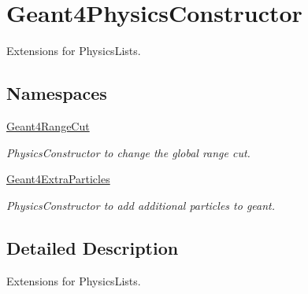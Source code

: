 \hypertarget{group___geant4_physics_constructor}{}\section{Geant4\+Physics\+Constructor}
\label{group___geant4_physics_constructor}


Extensions for Physics\+Lists.  


\subsection*{Namespaces}
\begin{DoxyCompactItemize}
\item 
 \hyperlink{namespace_geant4_range_cut}{Geant4\+Range\+Cut}
\begin{DoxyCompactList}\small\item\em Physics\+Constructor to change the global range cut. \end{DoxyCompactList}\item 
 \hyperlink{namespace_geant4_extra_particles}{Geant4\+Extra\+Particles}
\begin{DoxyCompactList}\small\item\em Physics\+Constructor to add additional particles to geant. \end{DoxyCompactList}\end{DoxyCompactItemize}


\subsection{Detailed Description}
Extensions for Physics\+Lists. 

